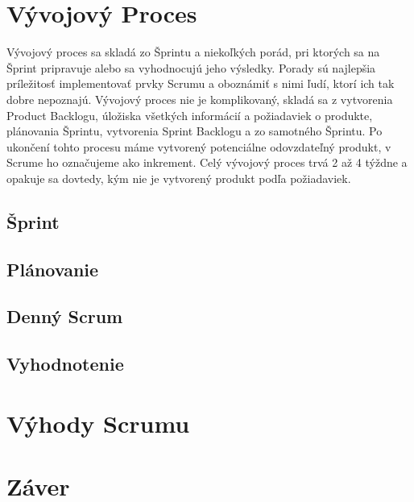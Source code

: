 \documentclass[10pt,slovak,a4paper]{article}
\begin{document}
\section{Vývojový Proces} \label{proces} 

Vývojový proces sa skladá zo Šprintu a niekoľkých porád, pri ktorých sa na Šprint pripravuje alebo sa vyhodnocujú jeho výsledky. Porady sú najlepšia príležitosť implementovať prvky Scrumu a oboznámiť s nimi ľudí, ktorí ich tak dobre nepoznajú. Vývojový proces nie je komplikovaný, skladá sa z vytvorenia Product Backlogu, úložiska všetkých informácií a požiadaviek o produkte, plánovania Šprintu, vytvorenia Sprint Backlogu a zo samotného Šprintu. Po ukončení tohto procesu máme vytvorený potenciálne odovzdateľný produkt, v Scrume ho označujeme ako inkrement. Celý vývojový proces trvá 2 až 4 týždne a opakuje sa dovtedy, kým nie je vytvorený produkt podľa požiadaviek.~\cite{techScrum} 

\subsection{Šprint}

\subsection{Plánovanie}

\subsection{Denný Scrum}

\subsection{Vyhodnotenie}

\section{Výhody Scrumu} \label{proces}

\section{Záver} \label{zaver}




\end{document}
